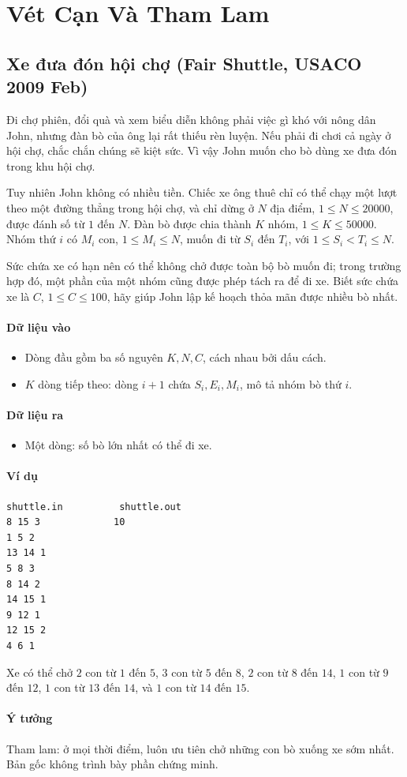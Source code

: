 \documentclass[11pt]{article}
\newcommand{\problem}[1]{\subsection{#1}}
\newcommand{\iosec}[1]{\paragraph{#1}}
\begin{document}
\section{Vét Cạn Và Tham Lam}

\problem{Xe đưa đón hội chợ (Fair Shuttle, USACO 2009 Feb)}

Đi chợ phiên, đổi quà và xem biểu diễn không phải việc gì khó với nông dân John, nhưng đàn bò của ông lại rất thiếu rèn luyện. Nếu phải đi chơi cả ngày ở hội chợ, chắc chắn chúng sẽ kiệt sức. Vì vậy John muốn cho bò dùng xe đưa đón trong khu hội chợ.

Tuy nhiên John không có nhiều tiền. Chiếc xe ông thuê chỉ có thể chạy một lượt theo một đường thẳng trong hội chợ, và chỉ dừng ở \(N\) địa điểm, \(1 \le N \le 20000\), được đánh số từ \(1\) đến \(N\). Đàn bò được chia thành \(K\) nhóm, \(1 \le K \le 50000\). Nhóm thứ \(i\) có \(M_i\) con, \(1 \le M_i \le N\), muốn đi từ \(S_i\) đến \(T_i\), với \(1 \le S_i < T_i \le N\).

Sức chứa xe có hạn nên có thể không chở được toàn bộ bò muốn đi; trong trường hợp đó, một phần của một nhóm cũng được phép tách ra để đi xe. Biết sức chứa xe là \(C\), \(1 \le C \le 100\), hãy giúp John lập kế hoạch thỏa mãn được nhiều bò nhất.

\iosec{Dữ liệu vào}
\begin{itemize}
  \item Dòng đầu gồm ba số nguyên \(K,N,C\), cách nhau bởi dấu cách.
  \item \(K\) dòng tiếp theo: dòng \(i+1\) chứa \(S_i,E_i,M_i\), mô tả nhóm bò thứ \(i\).
\end{itemize}

\iosec{Dữ liệu ra}
\begin{itemize}
  \item Một dòng: số bò lớn nhất có thể đi xe.
\end{itemize}

\iosec{Ví dụ}
\begin{verbatim}
shuttle.in          shuttle.out
8 15 3             10
1 5 2
13 14 1
5 8 3
8 14 2
14 15 1
9 12 1
12 15 2
4 6 1
\end{verbatim}

Xe có thể chở \(2\) con từ \(1\) đến \(5\), \(3\) con từ \(5\) đến \(8\), \(2\) con từ \(8\) đến \(14\), \(1\) con từ \(9\) đến \(12\), \(1\) con từ \(13\) đến \(14\), và \(1\) con từ \(14\) đến \(15\).

\iosec{Ý tưởng}
Tham lam: ở mọi thời điểm, luôn ưu tiên chở những con bò xuống xe sớm nhất. Bản gốc không trình bày phần chứng minh.
\end{document}

